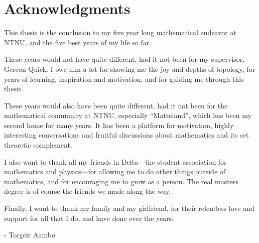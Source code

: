 

\section{Acknowledgments}

This thesis is the conclusion to my five year long mathematical endeavor at NTNU, and the five best years of my life so far. 

These years would not have quite different, had it not been for my supervisor, Gereon Quick. I owe him a lot for showing me the joy and depths of topology, for years of learning, inspiration and motivation, and for guiding me through this thesis. 

These years would also have been quite different, had it not been for the mathematical community at NTNU, especially ``Matteland'', which has been my second home for many years. It has been a platform for motivation, highly interesting conversations and fruitful discussions about mathematics and its set theoretic complement. 

I also want to thank all my friends in Delta---the student association for mathematics and physics---for allowing me to do other things outside of mathematics, and for encouraging me to grow as a person. The real masters degree is of course the friends we made along the way. 

Finally, I want to thank my family and my girlfriend, for their relentless love and support for all that I do, and have done over the years. 

\hspace{\fill} - Torgeir Aambø
